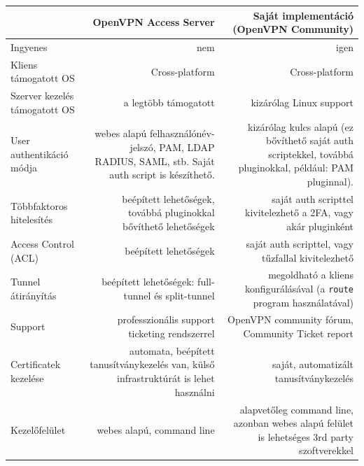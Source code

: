 \begin{table}[h]
\label{tab:openvpn_apps}
\begin{tabularx}{\textwidth}{l|D|D}
 & OpenVPN Access Server \cite{openvpnaccessserver} & Saját implementáció (OpenVPN Community) \\
\hline
Ingyenes & nem & igen \\
\hline
Kliens támogatott OS & Cross-platform & Cross-platform \\
\hline
Szerver kezelés támogatott OS & a legtöbb támogatott & kizárólag Linux support\\
\hline
User authentikáció módja & webes alapú felhasználónév-jelszó, PAM, LDAP \newline RADIUS, SAML, stb. Saját auth script is készíthető. & kizárólag kulcs alapú (ez bővíthető saját auth scriptekkel, továbbá pluginokkal, például: PAM pluginnal). \\
\hline
Többfaktoros hitelesítés & beépített lehetőségek, továbbá pluginokkal bővíthető lehetőségek & saját auth scripttel kivitelezhető a 2FA, vagy akár pluginként \\
\hline
Access Control (ACL) & beépített lehetőségek & saját auth scripttel, vagy tűzfallal kivitelezhető \\
\hline
Tunnel átirányítás & beépített lehetőségek: full-tunnel és split-tunnel & megoldható a kliens konfigurálásával (a \texttt{route} program használatával) \\
\hline
Support & professzionális support ticketing rendszerrel & OpenVPN community fórum, Community Ticket report \\
\hline
Certificatek kezelése & automata, beépített tanusítványkezelés van, külső infrastruktúrát is lehet használni & saját, automatizált tanusítványkezelés \\
\hline
Kezelőfelület & webes alapú, command line & alapvetőleg command line, azonban webes alapú felület is lehetséges 3rd party szoftverekkel
\end{tabularx}
\end{table}
